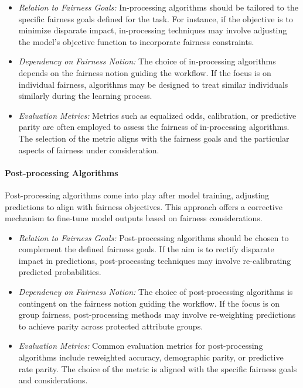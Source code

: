 \begin{itemize}

    \item \emph{Relation to Fairness Goals:} In-processing algorithms should be tailored to the specific fairness goals defined for the task. For instance, if the objective is to minimize disparate impact, in-processing techniques may involve adjusting the model's objective function to incorporate fairness constraints.

    \item \emph{Dependency on Fairness Notion:} The choice of in-processing algorithms depends on the fairness notion guiding the workflow. If the focus is on individual fairness, algorithms may be designed to treat similar individuals similarly during the learning process.

    \item \emph{Evaluation Metrics:} Metrics such as equalized odds, calibration, or predictive parity are often employed to assess the fairness of in-processing algorithms. The selection of the metric aligns with the fairness goals and the particular aspects of fairness under consideration.

\end{itemize}

\paragraph{Post-processing Algorithms}

Post-processing algorithms come into play after model training, adjusting predictions to align with fairness objectives. This approach offers a corrective mechanism to fine-tune model outputs based on fairness considerations.

\begin{itemize}

    \item \emph{Relation to Fairness Goals:} Post-processing algorithms should be chosen to complement the defined fairness goals. If the aim is to rectify disparate impact in predictions, post-processing techniques may involve re-calibrating predicted probabilities.

    \item \emph{Dependency on Fairness Notion:} The choice of post-processing algorithms is contingent on the fairness notion guiding the workflow. If the focus is on group fairness, post-processing methods may involve re-weighting predictions to achieve parity across protected attribute groups.

    \item \emph{Evaluation Metrics:} Common evaluation metrics for post-processing algorithms include reweighted accuracy, demographic parity, or predictive rate parity. The choice of the metric is aligned with the specific fairness goals and considerations.

\end{itemize}

